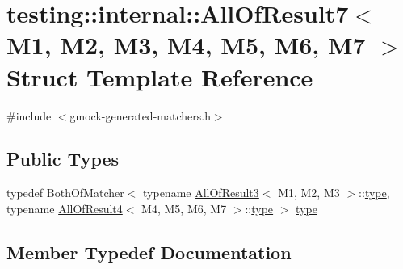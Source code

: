 \hypertarget{structtesting_1_1internal_1_1_all_of_result7}{}\section{testing\+::internal\+::All\+Of\+Result7$<$ M1, M2, M3, M4, M5, M6, M7 $>$ Struct Template Reference}
\label{structtesting_1_1internal_1_1_all_of_result7}


{\ttfamily \#include $<$gmock-\/generated-\/matchers.\+h$>$}

\subsection*{Public Types}
\begin{DoxyCompactItemize}
\item 
typedef Both\+Of\+Matcher$<$ typename \mbox{\hyperlink{structtesting_1_1internal_1_1_all_of_result3}{All\+Of\+Result3}}$<$ M1, M2, M3 $>$\+::\mbox{\hyperlink{structtesting_1_1internal_1_1_all_of_result7_a47ab0d670258434b0e65530591948e8c}{type}}, typename \mbox{\hyperlink{structtesting_1_1internal_1_1_all_of_result4}{All\+Of\+Result4}}$<$ M4, M5, M6, M7 $>$\+::\mbox{\hyperlink{structtesting_1_1internal_1_1_all_of_result7_a47ab0d670258434b0e65530591948e8c}{type}} $>$ \mbox{\hyperlink{structtesting_1_1internal_1_1_all_of_result7_a47ab0d670258434b0e65530591948e8c}{type}}
\end{DoxyCompactItemize}


\subsection{Member Typedef Documentation}
\mbox{\label{structtesting_1_1internal_1_1_all_of_result7_a47ab0d670258434b0e65530591948e8c}} 
